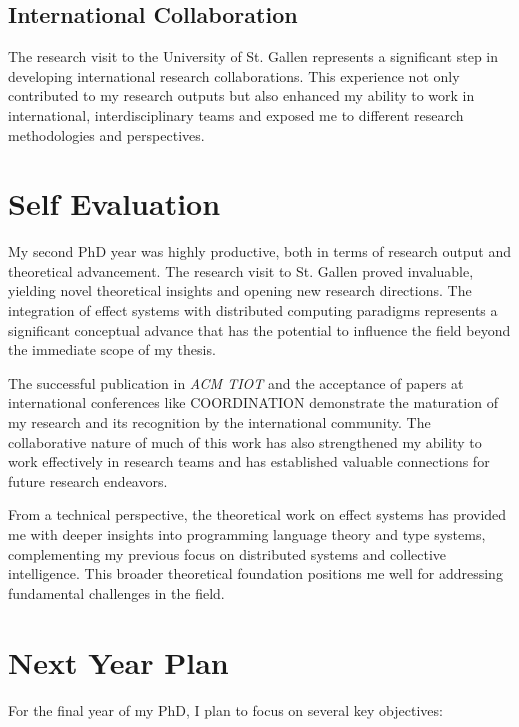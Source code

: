 \documentclass[runningheads]{llncs}
\begin{document}
\subsection{International Collaboration}

The research visit to the University of St. Gallen represents a significant step in developing international research collaborations. This experience not only contributed to my research outputs but also enhanced my ability to work in international, interdisciplinary teams and exposed me to different research methodologies and perspectives.

\section{Self Evaluation}

My second PhD year was highly productive, both in terms of research output and theoretical advancement.
%
The research visit to St. Gallen proved invaluable,
yielding novel theoretical insights and opening new research directions.
%
The integration of effect systems with distributed computing paradigms represents a significant conceptual advance that has the potential to influence the field beyond the immediate scope of my thesis.

The successful publication in \emph{ACM TIOT} and the acceptance of papers at international conferences like COORDINATION demonstrate the maturation of my research and its recognition by the international community.
%
The collaborative nature of much of this work has also strengthened my ability to work effectively in research teams and has established valuable connections for future research endeavors.

From a technical perspective,
the theoretical work on effect systems has provided me with deeper insights into programming language theory and type systems,
complementing my previous focus on distributed systems and collective intelligence.
%
This broader theoretical foundation positions me well for addressing fundamental challenges in the field.

\section{Next Year Plan}

For the final year of my PhD, I plan to focus on several key objectives:
\end{document}
